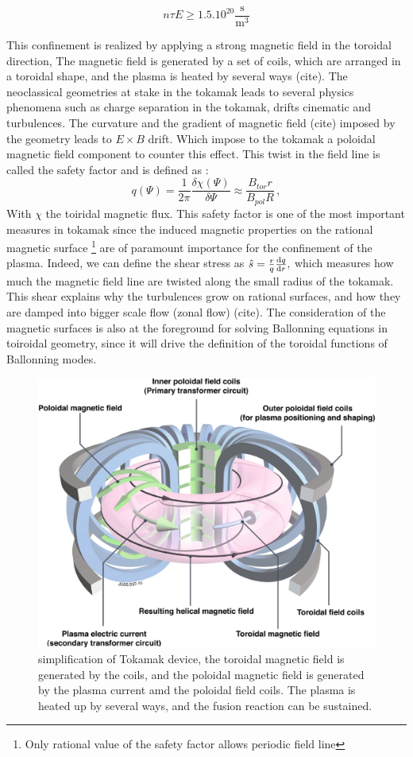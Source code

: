 \documentclass[11pt,a4paper]{report}
\begin{document}
\begin{multicols}{2}
    $$n \tau E \ge 1.5.10^{20}{\frac {\mathrm {s} }{\mathrm {m} ^{3}}}$$

    This confinement is realized by applying a strong magnetic field in the toroidal direction, The magnetic field is generated by a set of coils, which are arranged in a toroidal shape, and the plasma is heated by several ways (cite). The neoclassical geometries at stake in the tokamak leads to several physics phenomena such as charge separation in the tokamak, drifts cinematic and turbulences. The curvature and the gradient of magnetic field (cite) imposed by the geometry leads to $E \times B$ drift. Which impose to the tokamak a poloidal magnetic field component to counter this effect. This twist in the field line is called the safety factor and is defined as :
    $$q(\Psi) = \frac{1}{2\pi}\frac{\delta \chi (\Psi)}{\delta \Psi} \approx \frac{B_{tor}r}{B_{pol}R} \, ,$$
    With $\chi$ the toiridal magnetic flux. This safety factor is one of the most important measures in tokamak since the induced magnetic properties on the rational magnetic surface \footnote{Only rational value of the safety factor allows periodic field line} are of paramount importance for the confinement of the plasma. Indeed, we can define the shear stress as $\hat{s} = \frac{r}{q}\dv{q}{r},$ which measures how much the magnetic field line are twisted along the small radius of the tokamak. This shear explains why the turbulences grow on rational surfaces, and how they are damped into bigger scale flow (zonal flow) (cite). The consideration of the magnetic surfaces is also at the foreground for solving Ballonning equations in toiroidal geometry, since it will drive the definition of the toroidal functions of Ballonning modes.



    \begin{figure}[H]
        \centering
        \includegraphics[width=1\linewidth]{./figures/tokamak.png}
        \caption{simplification of Tokamak device, the toroidal magnetic field is generated by the coils, and the poloidal magnetic field is generated by the plasma current amd the poloidal field coils. The plasma is heated up by several ways, and the fusion reaction can be sustained.}
        \label{}
    \end{figure}


\end{multicols}
\end{document}
